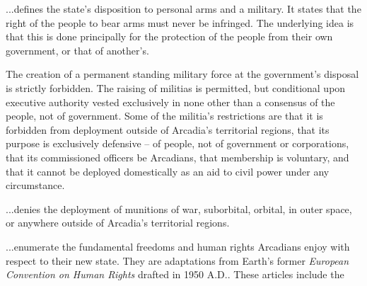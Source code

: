 \item %

...defines the state's disposition to personal arms and a military. It states that the right of the people to bear arms must never be infringed. The underlying idea is that this is done principally for the protection of the people from their own government, or that of another's.

The creation of a permanent standing military force at the government's disposal is strictly forbidden. The raising of militias is permitted, but conditional upon executive authority vested exclusively in none other than a consensus of the people, not of government. Some of the militia's restrictions are that it is forbidden from deployment outside of Arcadia's territorial regions, that its purpose is exclusively defensive -- of people, not of government or corporations, that its commissioned officers be Arcadians, that membership is voluntary, and that it cannot be deployed domestically as an aid to civil power under any circumstance.

\item %

...denies the deployment of munitions of war, suborbital, orbital, in outer space, or anywhere outside of Arcadia's territorial regions.
\stoparticle

\startarticle[start=11]
\item %

...enumerate the fundamental freedoms and human rights Arcadians enjoy with respect to their new state. They are adaptations from Earth's former {\it European Convention on Human Rights} drafted in 1950 A.D.. These articles include the

